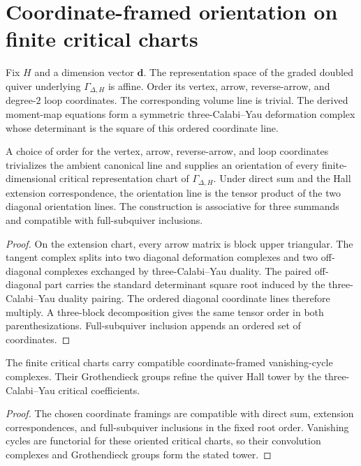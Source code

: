 \chapter{Coordinate-framed orientation on finite critical charts}
Fix $H$ and a dimension vector $\mathbf d$.  The representation space of the graded doubled quiver underlying $\Gamma_{\Delta,H}$ is affine.  Order its vertex, arrow, reverse-arrow, and degree-$2$ loop coordinates.  The corresponding volume line is trivial.  The derived moment-map equations form a symmetric three-Calabi--Yau deformation complex whose determinant is the square of this ordered coordinate line.

\begin{theorem}
A choice of order for the vertex, arrow, reverse-arrow, and loop coordinates trivializes the ambient canonical line and supplies an orientation of every finite-dimensional critical representation chart of $\Gamma_{\Delta,H}$.  Under direct sum and the Hall extension correspondence, the orientation line is the tensor product of the two diagonal orientation lines.  The construction is associative for three summands and compatible with full-subquiver inclusions.
\end{theorem}
\begin{proof}
On the extension chart, every arrow matrix is block upper triangular.  The tangent complex splits into two diagonal deformation complexes and two off-diagonal complexes exchanged by three-Calabi--Yau duality.  The paired off-diagonal part carries the standard determinant square root induced by the three-Calabi--Yau duality pairing.  The ordered diagonal coordinate lines therefore multiply.  A three-block decomposition gives the same tensor order in both parenthesizations.  Full-subquiver inclusion appends an ordered set of coordinates.
\end{proof}

\begin{corollary}
The finite critical charts carry compatible coordinate-framed vanishing-cycle complexes.  Their Grothendieck groups refine the quiver Hall tower by the three-Calabi--Yau critical coefficients.
\end{corollary}
\begin{proof}
The chosen coordinate framings are compatible with direct sum, extension correspondences, and full-subquiver inclusions in the fixed root order.  Vanishing cycles are functorial for these oriented critical charts, so their convolution complexes and Grothendieck groups form the stated tower.
\end{proof}

